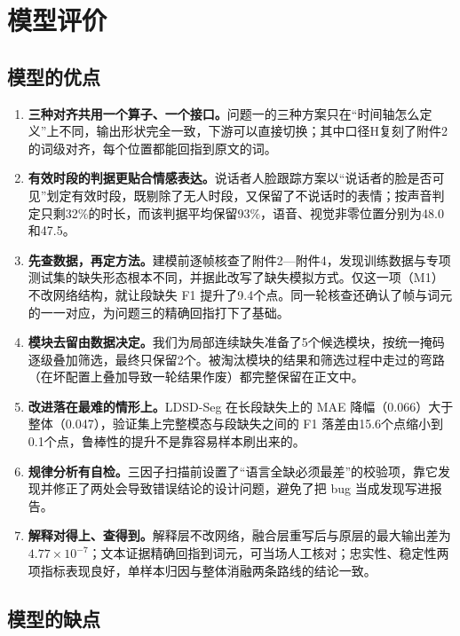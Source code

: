 \section{模型评价}\label{sec:eval}

\subsection{模型的优点}

\begin{enumerate}[label=\arabic*.]
\item \textbf{三种对齐共用一个算子、一个接口。}问题一的三种方案只在“时间轴怎么定义”上不同，输出形状完全一致，下游可以直接切换；其中口径H复刻了附件2的词级对齐，每个位置都能回指到原文的词。
\item \textbf{有效时段的判据更贴合情感表达。}说话者人脸跟踪方案以“说话者的脸是否可见”划定有效时段，既剔除了无人时段，又保留了不说话时的表情；按声音判定只剩32\%的时长，而该判据平均保留93\%，语音、视觉非零位置分别为48.0和47.5。
\item \textbf{先查数据，再定方法。}建模前逐帧核查了附件2—附件4，发现训练数据与专项测试集的缺失形态根本不同，并据此改写了缺失模拟方式。仅这一项（M1）不改网络结构，就让段缺失 F1 提升了9.4个点。同一轮核查还确认了帧与词元的一一对应，为问题三的精确回指打下了基础。
\item \textbf{模块去留由数据决定。}我们为局部连续缺失准备了5个候选模块，按统一掩码逐级叠加筛选，最终只保留2个。被淘汰模块的结果和筛选过程中走过的弯路（在坏配置上叠加导致一轮结果作废）都完整保留在正文中。
\item \textbf{改进落在最难的情形上。}LDSD-Seg 在长段缺失上的 MAE 降幅（0.066）大于整体（0.047），验证集上完整模态与段缺失之间的 F1 落差由15.6个点缩小到0.1个点，鲁棒性的提升不是靠容易样本刷出来的。
\item \textbf{规律分析有自检。}三因子扫描前设置了“语言全缺必须最差”的校验项，靠它发现并修正了两处会导致错误结论的设计问题，避免了把 bug 当成发现写进报告。
\item \textbf{解释对得上、查得到。}解释层不改网络，融合层重写后与原层的最大输出差为 $4.77\times10^{-7}$；文本证据精确回指到词元，可当场人工核对；忠实性、稳定性两项指标表现良好，单样本归因与整体消融两条路线的结论一致。
\end{enumerate}

\subsection{模型的缺点}

